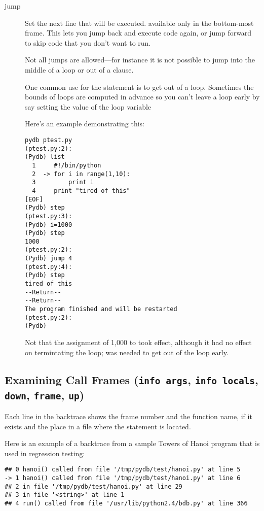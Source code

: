 \begin{description}
\item[jump ]

Set the next line that will be executed. available only in the
bottom-most frame.  This lets you jump back and execute code
again, or jump forward to skip code that you don't want to run.

Not all jumps are allowed---for instance it
is not possible to jump into the middle of a  loop or out
of a  clause.

One common use for the  statement is to get out of a
loop. Sometimes the bounds of loops are computed in advance so you
can't leave a loop early by say setting the value of the loop variable

Here's an example demonstrating this:

\begin{verbatim}
pydb ptest.py
(ptest.py:2): 
(Pydb) list
  1  	#!/bin/python
  2  ->	for i in range(1,10):
  3  	    print i
  4  	print "tired of this"
[EOF]
(Pydb) step
(ptest.py:3): 
(Pydb) i=1000
(Pydb) step
1000
(ptest.py:2): 
(Pydb) jump 4
(ptest.py:4): 
(Pydb) step
tired of this
--Return--
--Return--
The program finished and will be restarted
(ptest.py:2): 
(Pydb) 
\end{verbatim}

Not that the assignment of 1,000 to  took effect, although it
had no effect on termintating the  loop;  was
needed to get out of the loop early.

\end{description}

\subsection{Examining Call Frames ({\tt info args}, {\tt info
    locals}, {\tt down}, {\tt frame}, {\tt up})\label{subsection-frames}}

Each line in the backtrace shows the frame number and the function
name, if it exists and the place in a file where the statement is
located.

Here is an example of a backtrace from a sample Towers of Hanoi
program that is used in regression testing:

\begin{verbatim}
## 0 hanoi() called from file '/tmp/pydb/test/hanoi.py' at line 5
-> 1 hanoi() called from file '/tmp/pydb/test/hanoi.py' at line 6
## 2 in file '/tmp/pydb/test/hanoi.py' at line 29
## 3 in file '<string>' at line 1
## 4 run() called from file '/usr/lib/python2.4/bdb.py' at line 366
\end{verbatim}


